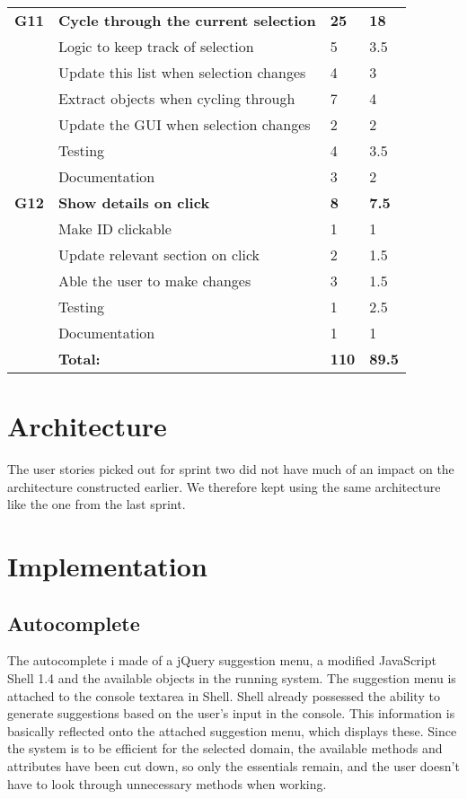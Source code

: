 \begin{table}
\begin{tabular}{ l p{8cm} l l }
 \bf{G11}	  &\bf{Cycle through the current selection}	&\bf{25}		&\bf{18}		     \\
		  &Logic to keep track of selection			&5			&3.5		\\
		  &Update this list when selection changes	&4			&3		\\
		  &Extract objects when cycling through		&7			&4		\\
		  &Update the GUI when selection changes	&2			&2		\\
		  &Testing							&4			&3.5		\\
		  &Documentation						&3			&2		\\

\bf{G12}	  &\bf{Show details on click}			&\bf{8}		&\bf{7.5}		     \\
		  &Make ID clickable					&1			&1		\\
		  &Update relevant section on click		&2			&1.5		\\
		  &Able the user to make changes		&3			&1.5		\\
		  &Testing						&1			&2.5		\\
		  &Documentation					&1			&1		\\
\hline 
		  &\bf{Total:}						&\bf{110}		&\bf{89.5}		\\
\hline
\end{tabular}
\label{table:sp2usrstories}
\end{table}


\section{Architecture}
The user stories picked out for sprint two did not have much of an impact on the architecture constructed earlier. We therefore kept using the same architecture like the one from the last sprint. 

\section{Implementation}

\subsection{Autocomplete}
The autocomplete i made of a jQuery suggestion menu, a modified JavaScript Shell 1.4 and the available objects in the running system. The suggestion menu is attached to the console textarea in Shell. Shell already possessed the ability to generate suggestions based on the user’s input in the console. This information is basically reflected onto the attached suggestion menu, which displays these. Since the system is to be efficient for the selected domain, the available methods and attributes have been cut down, so only the essentials remain, and the user doesn't have to look through unnecessary methods when working.


